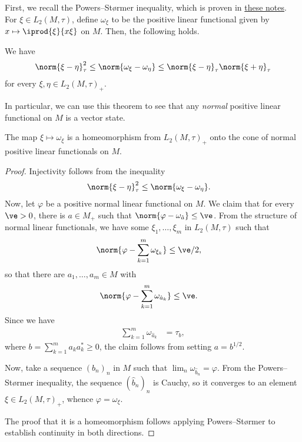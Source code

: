 \documentclass[10pt]{mypackage}
\begin{document}
First, we recall the Powers--Størmer inequality, which is proven in \href{https://ai-bearing.github.io/Classes_and_Homework/After\%20College/Other\%20Notes/injective_implies_hyperfinite.pdf}{these notes}. For $\xi\in L_2\left( M,\tau \right)$, define $\omega_{\xi}$ to be the positive linear functional given by $ x\mapsto \iprod{\xi}{x\xi} $ on $M$. Then, the following holds.
\begin{theorem}
  We have
  \begin{align*}
    \norm{\xi-\eta}_{\tau}^2 \leq \norm{\omega_{\xi}-\omega_{\eta}}\leq \norm{\xi-\eta}_{\tau}\norm{\xi + \eta}_{\tau}
  \end{align*}
  for every $\xi,\eta\in L_{2}\left( M,\tau \right)_{+}$.
\end{theorem}
In particular, we can use this theorem to see that any \textit{normal} positive linear functional on $M$ is a vector state.
\begin{theorem}
  The map $\xi\mapsto \omega_{\xi}$ is a homeomorphism from $L_2\left( M,\tau \right)_{+}$ onto the cone of normal positive linear functionals on $M$.
\end{theorem}
\begin{proof}
  Injectivity follows from the inequality
  \begin{align*}
    \norm{\xi-\eta}_{\tau}^2 &\leq \norm{\omega_{\xi}-\omega_{\eta}}.
  \end{align*}
  Now, let $\varphi$ be a positive normal linear functional on $M$. We claim that for every $\ve > 0$, there is $a\in M_{+}$ such that $\norm{\varphi-\omega_{\hat{a}}}\leq \ve$. From the structure of normal linear functionals, we have some $\xi_1,\dots,\xi_m$ in $L_2\left( M,\tau \right)$ such that
  \begin{align*}
    \norm{\varphi-\sum_{k=1}^{m}\omega_{\xi_k}} &\leq \ve/2,
  \end{align*}
  so that there are $a_1,\dots,a_m\in M$ with
  \begin{align*}
    \norm{\varphi-\sum_{k=1}^{m}\omega_{\hat{a}_k}} &\leq \ve.
  \end{align*}
  Since we have
  \begin{align*}
    \sum_{k=1}^{m}\omega_{\hat{a}_k} &= \tau_b,
  \end{align*}
  where $b = \sum_{k=1}^{m}a_ka_k^{\ast}\geq 0$, the claim follows from setting $a = b^{1/2}$.

  Now, take a sequence $\left( b_n \right)_n$ in $M$ such that $\lim_{n}\omega_{\hat{b}_n} = \varphi$. From the Powers--Størmer inequality, the sequence $\left( \hat{b}_n \right)_n$ is Cauchy, so it converges to an element $\xi\in L_2\left( M,\tau \right)_{+}$, whence $\varphi = \omega_{\xi}$.

  The proof that it is a homeomorphism follows applying Powers--Størmer to establish continuity in both directions.
\end{proof}
\end{document}
